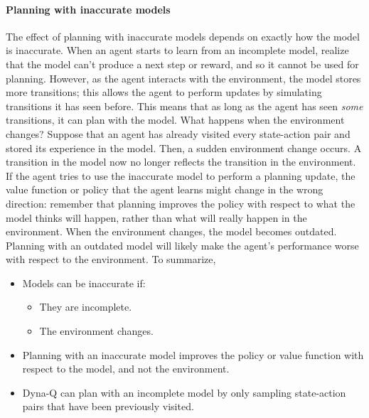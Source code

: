 \documentclass[12pt]{article}
\begin{document}
\paragraph{Planning with inaccurate models} The effect of planning with inaccurate models depends on exactly how the model is inaccurate. When an agent starts to learn from an incomplete model, realize that the model can't produce a next step or reward, and so it cannot be used for planning. However, as the agent interacts with the environment, the model stores more transitions; this allows the agent to perform updates by simulating transitions it has seen before. This means that as long as the agent has seen \emph{some} transitions, it can plan with the model. What happens when the environment changes? Suppose that an agent has already visited every state-action pair and stored its experience in the model. Then, a sudden environment change occurs. A transition in the model now no longer reflects the transition in the environment. If the agent tries to use the inaccurate model to perform a planning update, the value function or policy that the agent learns might change in the wrong direction: remember that planning improves the policy with respect to what the model thinks will happen, rather than what will really happen in the environment. When the environment changes, the model becomes outdated. Planning with an outdated model will likely make the agent's performance worse with respect to the environment. To summarize, 
\begin{itemize}
  \item Models can be inaccurate if:
  \begin{itemize}
  \item They are incomplete.
  \item The environment changes.
  \end{itemize}
\item Planning with an inaccurate model improves the policy or value function   with respect to the model, and not the environment.
\item Dyna-Q can plan with an incomplete model by only sampling state-action pairs that have been previously visited.
\end{itemize}
\end{document}
